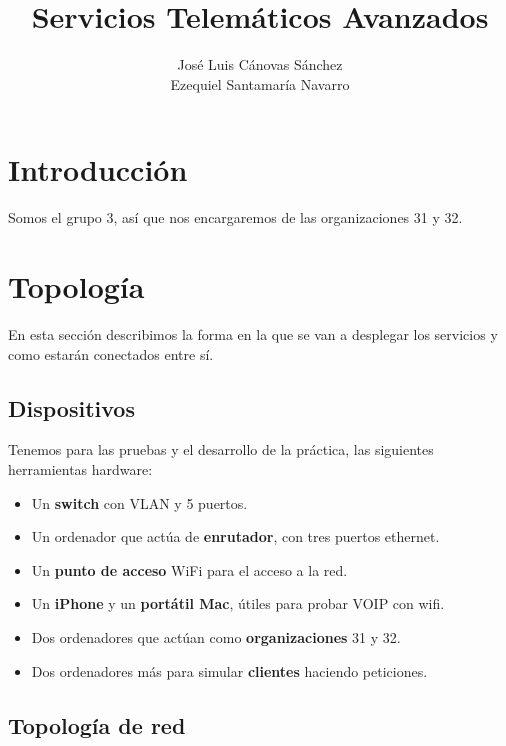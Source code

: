 \documentclass[]{article}
\title{Servicios Telemáticos Avanzados}
\author{José Luis Cánovas Sánchez\\Ezequiel Santamaría Navarro}
\begin{document}
\maketitle

\begin{abstract}
\end{abstract}

\tableofcontents


\section{Introducción}

Somos el grupo 3, así que nos encargaremos de las organizaciones 31 y 32.

\section{Topología}

En esta sección describimos la forma en la que se van a desplegar los servicios y como estarán
conectados entre sí. 

\subsection{Dispositivos}

Tenemos para las pruebas y el desarrollo de la práctica, las siguientes herramientas hardware:

\begin{itemize}

	\item Un \textbf{switch} con VLAN y 5 puertos.
	\item Un ordenador que actúa de \textbf{enrutador}, con tres puertos ethernet.
	\item Un \textbf{punto de acceso} WiFi para el acceso a la red.
	\item Un \textbf{iPhone} y un \textbf{portátil Mac}, útiles para probar VOIP con wifi.
	\item Dos ordenadores que actúan como \textbf{organizaciones} 31 y 32. 
	\item Dos ordenadores más para simular \textbf{clientes} haciendo peticiones.

\end{itemize}

\subsection{Topología de red}
\end{document}
